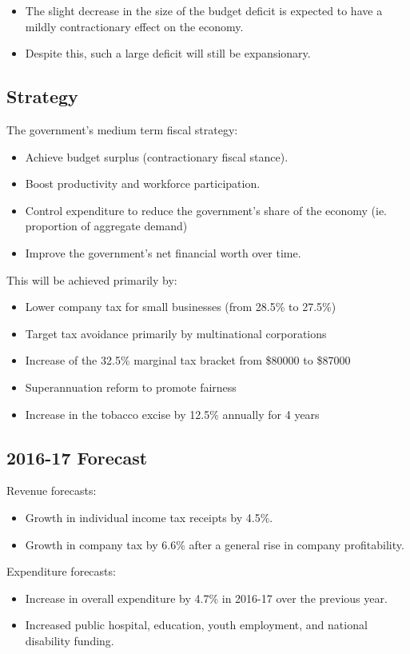 \documentclass[a4paper,11pt]{article}
\begin{document}
\begin{itemize}
\item The slight decrease in the size of the budget deficit is expected to have
	a mildly contractionary effect on the economy.
\item Despite this, such a large deficit will still be expansionary.
\end{itemize}


\subsection{Strategy}

The government's medium term fiscal strategy:

\begin{itemize}
\item Achieve budget surplus (contractionary fiscal stance).
\item Boost productivity and workforce participation.
\item Control expenditure to reduce the government's share of the economy (ie.
	proportion of aggregate demand)
\item Improve the government's net financial worth over time.
\end{itemize}

This will be achieved primarily by:

\begin{itemize}
\item Lower company tax for small businesses (from 28.5\% to 27.5\%)
\item Target tax avoidance primarily by multinational corporations
\item Increase of the 32.5\% marginal tax bracket from \$80000 to \$87000
\item Superannuation reform to promote fairness
\item Increase in the tobacco excise by 12.5\% annually for 4 years
\end{itemize}


\subsection{2016-17 Forecast}

Revenue forecasts:

\begin{itemize}
\item Growth in individual income tax receipts by 4.5\%.
\item Growth in company tax by 6.6\% after a general rise in company
	profitability.
\end{itemize}

Expenditure forecasts:

\begin{itemize}
\item Increase in overall expenditure by 4.7\% in 2016-17 over the previous
	year.
\item Increased public hospital, education, youth employment, and national
	disability funding.
\end{itemize}
\end{document}
